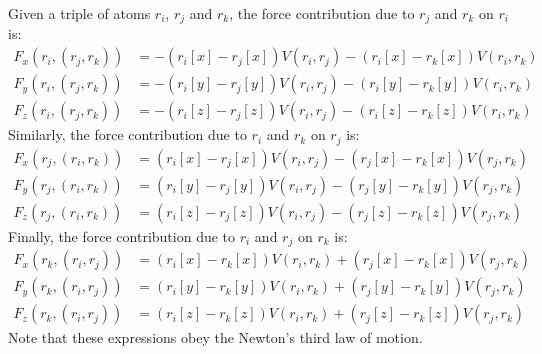 \documentclass[letterpaper,12pt]{article}
\begin{document}
Given a triple of atoms $r_i$, $r_j$ and $r_k$, the force contribution
due to $r_j$ and $r_k$ on $r_i$ is:
\begin{align*}
F_x(r_i, (r_j, r_k)) &= -(r_i[x] - r_j[x]) V(r_i, r_j) - (r_i[x] -
r_k[x]) V(r_i, r_k)\\
F_y(r_i, (r_j, r_k)) &= -(r_i[y] - r_j[y]) V(r_i, r_j) - (r_i[y] -
r_k[y]) V(r_i, r_k)\\
F_z(r_i, (r_j, r_k)) &= -(r_i[z] - r_j[z]) V(r_i, r_j) - (r_i[z] -
r_k[z]) V(r_i, r_k)
\end{align*}
Similarly, the force contribution due to $r_i$ and $r_k$ on $r_j$ is:
\begin{align*}
F_x(r_j, (r_i, r_k)) &= (r_i[x] - r_j[x]) V(r_i, r_j) - (r_j[x] -
r_k[x]) V(r_j, r_k)\\
F_y(r_j, (r_i, r_k)) &= (r_i[y] - r_j[y]) V(r_i, r_j) - (r_j[y] -
r_k[y]) V(r_j, r_k)\\
F_z(r_j, (r_i, r_k)) &= (r_i[z] - r_j[z]) V(r_i, r_j) - (r_j[z] -
r_k[z]) V(r_j, r_k)
\end{align*}
Finally, the force contribution due to $r_i$ and $r_j$ on $r_k$ is:
\begin{align*}
F_x(r_k, (r_i, r_j)) &= (r_i[x] - r_k[x]) V(r_i, r_k) + (r_j[x] -
r_k[x]) V(r_j, r_k)\\
F_y(r_k, (r_i, r_j)) &= (r_i[y] - r_k[y]) V(r_i, r_k) + (r_j[y] -
r_k[y]) V(r_j, r_k)\\
F_z(r_k, (r_i, r_j)) &= (r_i[z] - r_k[z]) V(r_i, r_k) + (r_j[z] -
r_k[z]) V(r_j, r_k)
\end{align*}
Note that these expressions obey the Newton's third law of motion.
\end{document}
